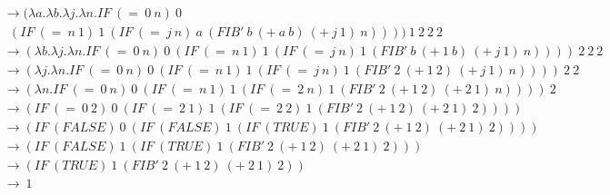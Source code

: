 \documentclass{article}
\begin{document}
\begin{enumerate}
\begin{align*}
\\&\rightarrow (\lambda a . \lambda b . \lambda j . \lambda n .IF\ (=\ 0\ n)\ 0\ \\&\ \ (IF\ (=\ n\ 1)\ 1\ (IF\ (=\ j\ n)\ a\ (FIB'\ b\ (+\ a\ b)\ (+\ j\ 1)\ n))))\ 1\ 2\ 2\ 2
\\&\rightarrow (\lambda b . \lambda j . \lambda n .IF\ (=\ 0\ n)\ 0\ (IF\ (=\ n\ 1)\ 1\ (IF\ (=\ j\ n)\ 1\ (FIB'\ b\ (+\ 1\ b)\ (+\ j\ 1)\ n))))\ 2\ 2\ 2
\\&\rightarrow (\lambda j . \lambda n .IF\ (=\ 0\ n)\ 0\ (IF\ (=\ n\ 1)\ 1\ (IF\ (=\ j\ n)\ 1\ (FIB'\ 2\ (+\ 1\ 2)\ (+\ j\ 1)\ n))))\ 2\ 2
\\&\rightarrow (\lambda n .IF\ (=\ 0\ n)\ 0\ (IF\ (=\ n\ 1)\ 1\ (IF\ (=\ 2\ n)\ 1\ (FIB'\ 2\ (+\ 1\ 2)\ (+\ 2\ 1)\ n))))\ 2
\\&\rightarrow (IF\ (=\ 0\ 2)\ 0\ (IF\ (=\ 2\ 1)\ 1\ (IF\ (=\ 2\ 2)\ 1\ (FIB'\ 2\ (+\ 1\ 2)\ (+\ 2\ 1)\ 2))))
\\&\rightarrow (IF\ (FALSE)\ 0\ (IF\ (FALSE)\ 1\ (IF\ (TRUE)\ 1\ (FIB'\ 2\ (+\ 1\ 2)\ (+\ 2\ 1)\ 2))))
\\&\rightarrow (IF\ (FALSE)\ 1\ (IF\ (TRUE)\ 1\ (FIB'\ 2\ (+\ 1\ 2)\ (+\ 2\ 1)\ 2)))
\\&\rightarrow (IF\ (TRUE)\ 1\ (FIB'\ 2\ (+\ 1\ 2)\ (+\ 2\ 1)\ 2))
\\&\rightarrow\ 1
\end{align*}

\end{enumerate}
\end{document}
